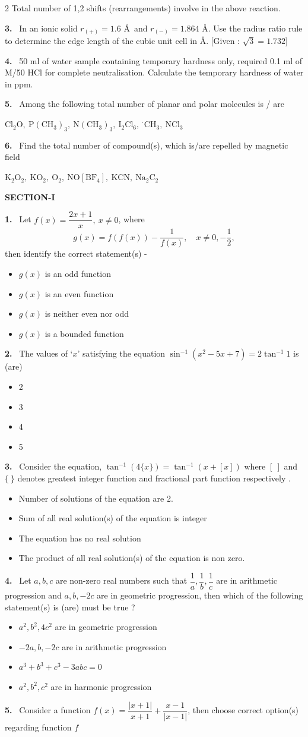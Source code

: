 \documentclass[10pt]{extarticle}
\newcommand{\partsec}[2]{\par\medskip\noindent{\large\bfseries PART-#1: #2}\par\smallskip}
\newcommand{\sect}[1]{\par\smallskip\noindent\textbf{#1}\par}
\newcommand{\qn}[1]{\par\smallskip\noindent\textbf{#1.}~}
\newenvironment{qoptions}{\begin{itemize}[leftmargin=1.8em,itemsep=1pt,topsep=2pt,label={}]}{\end{itemize}}
\newcommand{\opt}[2]{\item[(#1)] #2}
\begin{document}
\begin{multicols}{2}
Total number of 1,2 shifts (rearrangements) involve in the above reaction.
\qn{3} In an ionic solid $r_{(+)}=1.6$ \AA\ and $r_{(-)}=1.864$ \AA. Use the radius ratio rule to determine the edge length of the cubic unit cell in \AA. [Given : $\sqrt3=1.732$]
\qn{4} 50 ml of water sample containing temporary hardness only, required 0.1 ml of M/50 HCl for complete neutralisation. Calculate the temporary hardness of water in ppm.
\qn{5} Among the following total number of planar and polar molecules is / are

$\mathrm{Cl_2O,\ P(CH_3)_3,\ N(CH_3)_3,\ I_2Cl_6,\ {}^{\cdot}CH_3,\ NCl_3}$
\qn{6} Find the total number of compound(s), which is/are repelled by magnetic field

$\mathrm{K_2O_2,\ KO_2,\ O_2,\ NO[BF_4],\ KCN,\ Na_2C_2}$
\partsec{3}{MATHEMATICS}
\sect{SECTION-I}
\qn{1} Let $f(x)=\dfrac{2x+1}{x},\ x\neq0$, where \[g(x)=f(f(x))-\dfrac1{f(x)},\quad x\neq0,-\dfrac12,\] then identify the correct statement(s) -
\begin{qoptions}
\opt{A}{$g(x)$ is an odd function}
\opt{B}{$g(x)$ is an even function}
\opt{C}{$g(x)$ is neither even nor odd}
\opt{D}{$g(x)$ is a bounded function}
\end{qoptions}
\qn{2} The values of `$x$' satisfying the equation $\sin^{-1}(x^2-5x+7)=2\tan^{-1}1$ is (are)
\begin{qoptions}
\opt{A}{2}
\opt{B}{3}
\opt{C}{4}
\opt{D}{5}
\end{qoptions}
\qn{3} Consider the equation, $\tan^{-1}(4\{x\})=\tan^{-1}(x+[x])$ where $[\ ]$ and $\{\ \}$ denotes greatest integer function and fractional part function respectively .
\begin{qoptions}
\opt{A}{Number of solutions of the equation are 2.}
\opt{B}{Sum of all real solution(s) of the equation is integer}
\opt{C}{The equation has no real solution}
\opt{D}{The product of all real solution(s) of the equation is non zero.}
\end{qoptions}
\qn{4} Let $a,b,c$ are non-zero real numbers such that $\dfrac1a,\dfrac1b,\dfrac1c$ are in arithmetic progression and $a,b,-2c$ are in geometric progression, then which of the following statement(s) is (are) must be true ?
\begin{qoptions}
\opt{A}{$a^2,b^2,4c^2$ are in geometric progression}
\opt{B}{$-2a,b,-2c$ are in arithmetic progression}
\opt{C}{$a^3+b^3+c^3-3abc=0$}
\opt{D}{$a^2,b^2,c^2$ are in harmonic progression}
\end{qoptions}
\qn{5} Consider a function $f(x)=\dfrac{|x+1|}{x+1}+\dfrac{x-1}{|x-1|}$, then choose correct option(s) regarding function $f$

\end{multicols}
\end{document}
